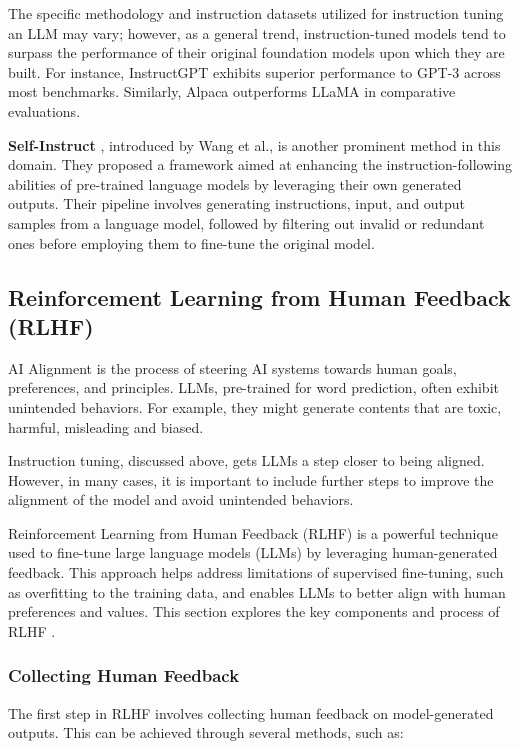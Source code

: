 The specific methodology and instruction datasets utilized for instruction tuning an LLM may vary; however, as a general trend, instruction-tuned models tend to surpass the performance of their original foundation models upon which they are built. For instance, InstructGPT \cite{ouyang2022training} exhibits superior performance to GPT-3 across most benchmarks. Similarly, Alpaca \cite{alpaca} outperforms LLaMA in comparative evaluations.

\textbf{Self-Instruct} \cite{wang2023selfinstruct}, introduced by Wang et al., is another prominent method in this domain. They proposed a framework aimed at enhancing the instruction-following abilities of pre-trained language models by leveraging their own generated outputs. Their pipeline involves generating instructions, input, and output samples from a language model, followed by filtering out invalid or redundant ones before employing them to fine-tune the original model.

\subsection{Reinforcement Learning from Human Feedback (RLHF)}

AI Alignment is the process of steering AI systems towards human goals, preferences, and principles. LLMs, pre-trained for word prediction, often exhibit unintended behaviors. For example, they might generate contents that are toxic, harmful, misleading and biased.

Instruction tuning, discussed above, gets LLMs a step closer to being aligned. However, in many cases, it is important to include further steps to improve the alignment of the model and avoid unintended behaviors.

Reinforcement Learning from Human Feedback (RLHF) is a powerful technique used to fine-tune large language models (LLMs) by leveraging human-generated feedback. This approach helps address limitations of supervised fine-tuning, such as overfitting to the training data, and enables LLMs to better align with human preferences and values. This section explores the key components and process of RLHF \cite{christiano2023deep}.

\subsubsection*{Collecting Human Feedback}

The first step in RLHF involves collecting human feedback on model-generated outputs. This can be achieved through several methods, such as:

